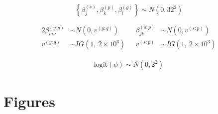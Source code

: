 \documentclass[12pt]{article}
\begin{document}
\begin{equation}
\left\{\beta^{(s)}_j, \beta^{(p)}_k, \beta^{(g)}_l\right\} \sim N(0, 32^2)
\end{equation}

%
\begin{alignat}{2}
\beta^{(y:q)}_{m\nu} &\sim N(0, v^{(y:q)}) 	&~~~ \beta^{(s:p)}_{jk} &\sim N(0, v^{(s:p)}) \\
v^{(y:q)} &\sim IG(1,~2\times10^{3}) 		&~~~ v^{(s:p)} &\sim IG(1,~2\times10^{3})
\end{alignat}


%
\begin{align}
\text{logit}(\phi) \sim N(0, 2^2) 
\end{align}



%
\section{Figures}
\end{document}
